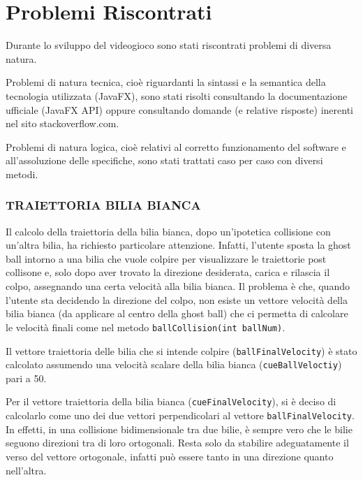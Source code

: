 \documentclass[12pt,a4paper]{report}
\begin{document}
\section{Problemi Riscontrati}\label{se:Issues} %
Durante lo sviluppo del videogioco sono stati riscontrati problemi di diversa natura.

\vspace{3mm}

Problemi di natura tecnica, cioè riguardanti la sintassi e la semantica della tecnologia utilizzata (JavaFX), sono stati risolti consultando la documentazione ufficiale (JavaFX API) oppure consultando domande (e relative risposte) inerenti nel sito stackoverflow.com.

\vspace{3mm}

Problemi di natura logica, cioè relativi al corretto funzionamento del software e all'assoluzione delle specifiche, sono stati trattati caso per caso con diversi metodi.

\subsubsection*{TRAIETTORIA BILIA BIANCA}
Il calcolo della traiettoria della bilia bianca, dopo un'ipotetica collisione con un'altra bilia, ha richiesto particolare attenzione.
Infatti, l'utente sposta la ghost ball intorno a una bilia che vuole colpire per visualizzare le traiettorie post collisone e, solo dopo aver trovato la direzione desiderata, carica e rilascia il colpo, assegnando una certa velocità alla bilia bianca.
Il problema è che, quando l'utente sta decidendo la direzione del colpo, non esiste un vettore velocità della bilia bianca (da applicare al centro della ghost ball) che ci permetta di calcolare le velocità finali come nel metodo \texttt{ballCollision(int ballNum)}.

Il vettore traiettoria delle bilia che si intende colpire (\texttt{ballFinalVelocity}) è stato calcolato assumendo una velocità scalare della bilia bianca (\texttt{cueBallVeloctiy}) pari a 50.

Per il vettore traiettoria della bilia bianca (\texttt{cueFinalVelocity}), si è deciso di calcolarlo come uno dei due vettori perpendicolari al vettore \texttt{ballFinalVelocity}. In effetti, in una collisione bidimensionale tra due bilie, è sempre vero che le bilie seguono direzioni tra di loro ortogonali. Resta solo da stabilire adeguatamente il verso del vettore ortogonale, infatti può essere tanto in una direzione quanto nell'altra.
\end{document}

